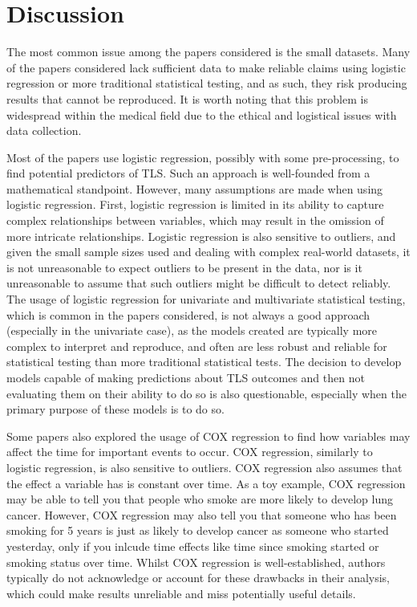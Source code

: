 \documentclass{article}
\begin{document}
\section{Discussion}

The most common issue among the papers considered is the small datasets. Many of the papers considered lack sufficient data to make reliable claims using logistic regression or more traditional statistical testing, and as such, they risk producing results that cannot be reproduced. It is worth noting that this problem is widespread within the medical field due to the ethical and logistical issues with data collection.

Most of the papers use logistic regression, possibly with some pre-processing, to find potential predictors of TLS. Such an approach is well-founded from a mathematical standpoint. However, many assumptions are made when using logistic regression. First, logistic regression is limited in its ability to capture complex relationships between variables, which may result in the omission of more intricate relationships. Logistic regression is also sensitive to outliers, and given the small sample sizes used and dealing with complex real-world datasets, it is not unreasonable to expect outliers to be present in the data, nor is it unreasonable to assume that such outliers might be difficult to detect reliably. The usage of logistic regression for univariate and multivariate statistical testing, which is common in the papers considered, is not always a good approach (especially in the univariate case), as the models created are typically more complex to interpret and reproduce, and often are less robust and reliable for statistical testing than more traditional statistical tests. The decision to develop models capable of making predictions about TLS outcomes and then not evaluating them on their ability to do so is also questionable, especially when the primary purpose of these models is to do so.

Some papers also explored the usage of COX regression to find how variables may affect the time for important events to occur. COX regression, similarly to logistic regression, is also sensitive to outliers. COX regression also assumes that the effect a variable has is constant over time. As a toy example, COX regression may be able to tell you that people who smoke are more likely to develop lung cancer. However, COX regression may also tell you that someone who has been smoking for 5 years is just as likely to develop cancer as someone who started yesterday, only if you inlcude time effects like time since smoking started or smoking status over time. Whilst COX regression is well-established, authors typically do not acknowledge or account for these drawbacks in their analysis, which could make results unreliable and miss potentially useful details.
\end{document}
